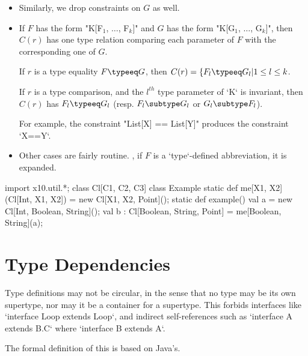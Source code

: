 {\begin{itemize}
\item Similarly, we drop constraints on {$G$} as well.

\item If {$F$} has the form \xcdmath"K[F$_1$, $\ldots$, F$_k$]"
and 
{$G$}
has the form \xcdmath"K[G$_1$, $\ldots$, G$_k$]", 
then {$C(r)$} has one type relation comparing each parameter of 
{$F$} with the corresponding one of {$G$}. 

If {$r$} is a type equality {$F \typeeq G$}, then 
{$C(r) = \{ F_l \typeeq G_l | 1 \le l \le k$}.

If {$r$} is a type comparison, and the {$l^{th}$} type parameter of \xcd`K` is
invariant,
then 
{$C(r)$} has {$F_l \typeeq G_l$}
(resp. {$F_l \subtype G_l$} or {$G_l \subtype F_l $}). 


For example, the constraint \xcdmath"List[X] == List[Y]" produces the
constraint \xcd`X==Y`.

\item Other cases are fairly routine.  \Eg, if {$F$} is a \xcd`type`-defined
      abbreviation, it is expanded.

\end{itemize}

\begin{ex}

\begin{xten}
import x10.util.*;
class Cl[C1, C2, C3]{}
class Example {
  static def me[X1, X2](Cl[Int, X1, X2]) = 
     new Cl[X1, X2, Point]();
  static def example() {
    val a = new Cl[Int, Boolean, String]();
    val b : Cl[Boolean, String, Point] = me[Boolean, String](a);
  }
}
\end{xten}
%

\end{ex}

\section{Type Dependencies}

Type definitions may not be circular, in the sense that no type may be its own
supertype, nor may it be a container for a supertype. This forbids interfaces
like \xcd`interface Loop extends Loop`, and indirect self-references such as
\xcd`interface A extends B.C` where \xcd`interface B extends A`.  

The formal definition of this is based on Java's.  

}
